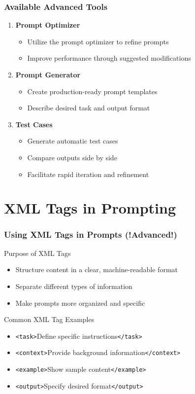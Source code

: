\documentclass{beamer}
\begin{document}
\begin{frame}
\frametitle{Available Advanced Tools}
\begin{enumerate}
\item \textbf{Prompt Optimizer}
\begin{itemize}
\item Utilize the prompt optimizer to refine prompts
\item Improve performance through suggested modifications
\end{itemize}

\item \textbf{Prompt Generator}
\begin{itemize}
\item Create production-ready prompt templates
\item Describe desired task and output format
\end{itemize}

\item \textbf{Test Cases}
\begin{itemize}
\item Generate automatic test cases
\item Compare outputs side by side
\item Facilitate rapid iteration and refinement
\end{itemize}
\end{enumerate}
\end{frame}
\section{XML Tags in Prompting}
\frame{\sectionpage}

\begin{frame}
\frametitle{Using XML Tags in Prompts (!Advanced!)}

\begin{block}{Purpose of XML Tags}
\begin{itemize}
\item Structure content in a clear, machine-readable format
\item Separate different types of information
\item Make prompts more organized and specific
\end{itemize}
\end{block}

\begin{exampleblock}{Common XML Tag Examples}
\begin{itemize}
\item \texttt{<task>}Define specific instructions\texttt{</task>}
\item \texttt{<context>}Provide background information\texttt{</context>}
\item \texttt{<example>}Show sample content\texttt{</example>}
\item \texttt{<output>}Specify desired format\texttt{</output>}
\end{itemize}
\end{exampleblock}

\end{frame}
\end{document}
